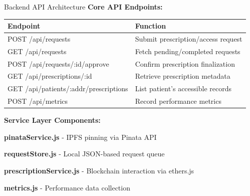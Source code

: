 \documentclass[10pt]{beamer}
\let\olditemize\itemize
\let\endolditemize\enditemize
\renewenvironment{itemize}
  {\olditemize\justifying}
  {\endolditemize}
\begin{document}
\begin{frame}{Backend API Architecture}
\footnotesize
\textbf{Core API Endpoints:}

\begin{table}[h]
\centering
\begin{tabular}{@{}ll@{}}
\toprule
\textbf{Endpoint} & \textbf{Function} \\
\midrule
POST /api/requests & Submit prescription/access request \\
GET /api/requests & Fetch pending/completed requests \\
POST /api/requests/:id/approve & Confirm prescription finalization \\
GET /api/prescriptions/:id & Retrieve prescription metadata \\
GET /api/patients/:addr/prescriptions & List patient's accessible records \\
POST /api/metrics & Record performance metrics \\
\bottomrule
\end{tabular}
\end{table}

\textbf{Service Layer Components:}
\begin{itemize}
\item \textbf{pinataService.js} - IPFS pinning via Pinata API
\item \textbf{requestStore.js} - Local JSON-based request queue
\item \textbf{prescriptionService.js} - Blockchain interaction via ethers.js
\item \textbf{metrics.js} - Performance data collection
\end{itemize}
\end{frame}
\end{document}
